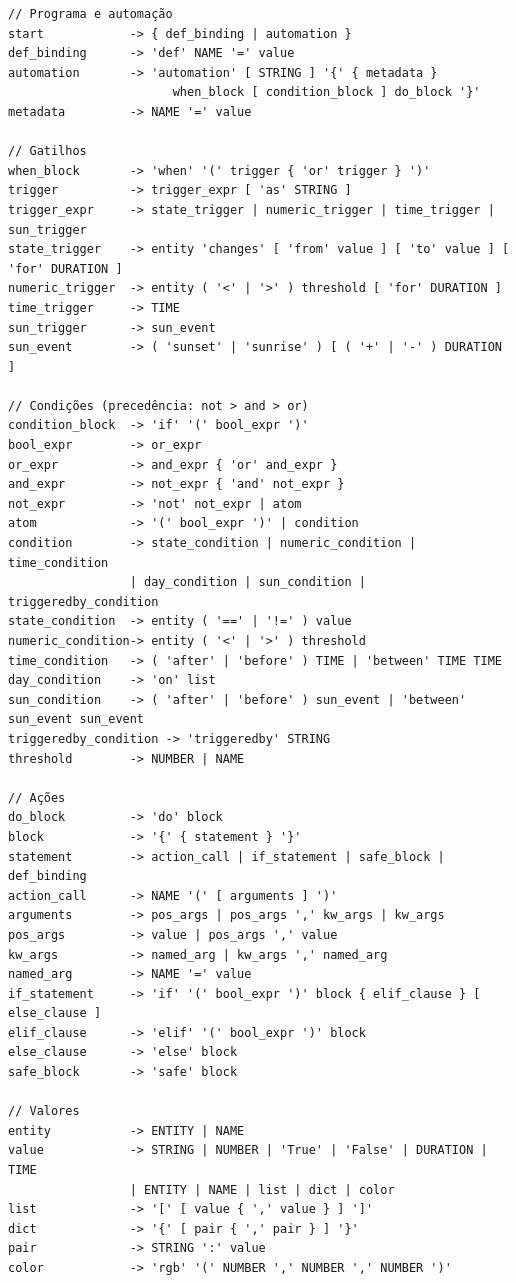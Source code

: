 \documentclass[12pt]{article}
\renewcommand\texttt[1]{\svtt{\small#1}}
\begin{document}
\begin{listing}[H]
    \centering
    \begin{verbatim}
// Programa e automação
start            -> { def_binding | automation }
def_binding      -> 'def' NAME '=' value
automation       -> 'automation' [ STRING ] '{' { metadata }
                       when_block [ condition_block ] do_block '}'
metadata         -> NAME '=' value

// Gatilhos
when_block       -> 'when' '(' trigger { 'or' trigger } ')'
trigger          -> trigger_expr [ 'as' STRING ]
trigger_expr     -> state_trigger | numeric_trigger | time_trigger | sun_trigger
state_trigger    -> entity 'changes' [ 'from' value ] [ 'to' value ] [ 'for' DURATION ]
numeric_trigger  -> entity ( '<' | '>' ) threshold [ 'for' DURATION ]
time_trigger     -> TIME
sun_trigger      -> sun_event
sun_event        -> ( 'sunset' | 'sunrise' ) [ ( '+' | '-' ) DURATION ]

// Condições (precedência: not > and > or)
condition_block  -> 'if' '(' bool_expr ')'
bool_expr        -> or_expr
or_expr          -> and_expr { 'or' and_expr }
and_expr         -> not_expr { 'and' not_expr }
not_expr         -> 'not' not_expr | atom
atom             -> '(' bool_expr ')' | condition
condition        -> state_condition | numeric_condition | time_condition
                 | day_condition | sun_condition | triggeredby_condition
state_condition  -> entity ( '==' | '!=' ) value
numeric_condition-> entity ( '<' | '>' ) threshold
time_condition   -> ( 'after' | 'before' ) TIME | 'between' TIME TIME
day_condition    -> 'on' list
sun_condition    -> ( 'after' | 'before' ) sun_event | 'between' sun_event sun_event
triggeredby_condition -> 'triggeredby' STRING
threshold        -> NUMBER | NAME

// Ações
do_block         -> 'do' block
block            -> '{' { statement } '}'
statement        -> action_call | if_statement | safe_block | def_binding
action_call      -> NAME '(' [ arguments ] ')'
arguments        -> pos_args | pos_args ',' kw_args | kw_args
pos_args         -> value | pos_args ',' value
kw_args          -> named_arg | kw_args ',' named_arg
named_arg        -> NAME '=' value
if_statement     -> 'if' '(' bool_expr ')' block { elif_clause } [ else_clause ]
elif_clause      -> 'elif' '(' bool_expr ')' block
else_clause      -> 'else' block
safe_block       -> 'safe' block

// Valores
entity           -> ENTITY | NAME
value            -> STRING | NUMBER | 'True' | 'False' | DURATION | TIME
                 | ENTITY | NAME | list | dict | color
list             -> '[' [ value { ',' value } ] ']'
dict             -> '{' [ pair { ',' pair } ] '}'
pair             -> STRING ':' value
color            -> 'rgb' '(' NUMBER ',' NUMBER ',' NUMBER ')'
    \end{verbatim}
    \caption{Produções da gramática do \texttt{jass}.}
    \label{lst:grammar}
\end{listing}
\end{document}
